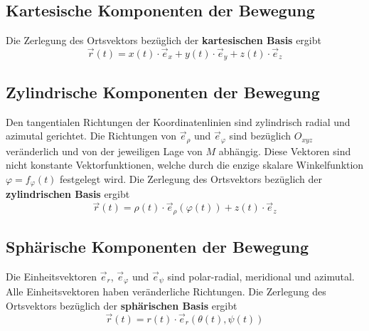 \subsection{Kartesische Komponenten der Bewegung}
Die Zerlegung des Ortsvektors bezüglich der \textbf{kartesischen Basis} ergibt
\begin{equation} 
\boxed{\overrightarrow{r}\left(t\right)=x\left(t\right)\cdot\overrightarrow{e}_x+y\left(t\right)\cdot\overrightarrow{e}_y+z\left(t\right)\cdot\overrightarrow{e}_z}
\end{equation} 
\subsection{Zylindrische Komponenten der Bewegung}
Den tangentialen Richtungen der Koordinatenlinien sind zylindrisch radial und azimutal gerichtet. Die Richtungen von $\overrightarrow{e}_{\rho}$ und $\overrightarrow{e}_{\varphi}$ sind bezüglich $O_{xyz}$ veränderlich und von der jeweiligen Lage von $M$ abhängig. Diese Vektoren sind nicht konstante Vektorfunktionen, welche durch die enzige skalare Winkelfunktion $\varphi=f_{\varphi}(t)$ festgelegt wird. Die Zerlegung des Ortsvektors bezüglich der \textbf{zylindrischen Basis} ergibt
\begin{equation}
\boxed{\overrightarrow{r}\left(t\right)=\rho\left(t\right)\cdot\overrightarrow{e}_{\rho}\left(\varphi(t)\right)+z\left(t\right)\cdot\overrightarrow{e}_z}
\end{equation}
\subsection{Sphärische Komponenten der Bewegung}
Die Einheitsvektoren $\overrightarrow{e}_r$, $\overrightarrow{e}_{\varphi}$ und $\overrightarrow{e}_{\psi}$ sind polar-radial, meridional und azimutal. Alle Einheitsvektoren haben veränderliche Richtungen. Die Zerlegung des Ortsvektors bezüglich der \textbf{sphärischen Basis} ergibt
\begin{equation}
\boxed{\overrightarrow{r}\left(t\right)=r\left(t\right)\cdot\overrightarrow{e}_r\left(\theta\left(t\right),\psi\left(t\right)\right)}
\end{equation}
